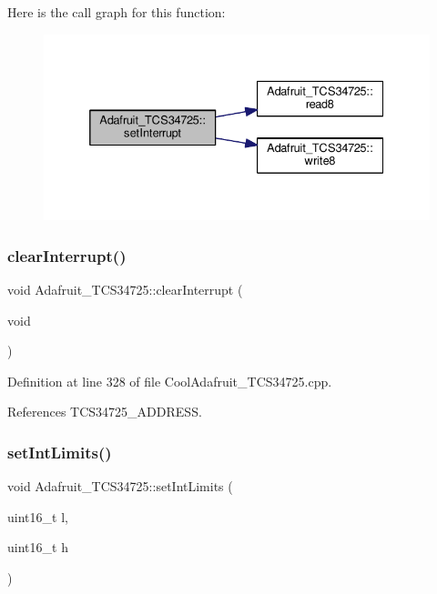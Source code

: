 Here is the call graph for this function\+:\nopagebreak
\begin{figure}[H]
\begin{center}
\leavevmode
\includegraphics[width=332pt]{df/d54/class_adafruit___t_c_s34725_ae477b116ac93cf075be20637207aee57_cgraph}
\end{center}
\end{figure}
\mbox{\label{class_adafruit___t_c_s34725_a731a3542039027f75170b667aaf8e3a0}} 
\subsubsection{\texorpdfstring{clear\+Interrupt()}{clearInterrupt()}}
{\footnotesize\ttfamily void Adafruit\+\_\+\+T\+C\+S34725\+::clear\+Interrupt (\begin{DoxyParamCaption}\item[{void}]{ }\end{DoxyParamCaption})}



Definition at line 328 of file Cool\+Adafruit\+\_\+\+T\+C\+S34725.\+cpp.



References T\+C\+S34725\+\_\+\+A\+D\+D\+R\+E\+SS.

\mbox{\label{class_adafruit___t_c_s34725_ac17b2447df066e30d1e64fe764f88770}} 
\subsubsection{\texorpdfstring{set\+Int\+Limits()}{setIntLimits()}}
{\footnotesize\ttfamily void Adafruit\+\_\+\+T\+C\+S34725\+::set\+Int\+Limits (\begin{DoxyParamCaption}\item[{uint16\+\_\+t}]{l,  }\item[{uint16\+\_\+t}]{h }\end{DoxyParamCaption})}



